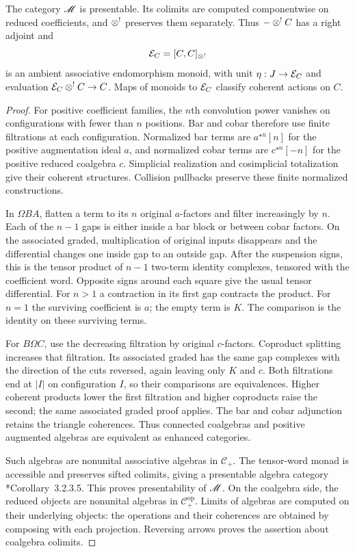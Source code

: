 \begin{lemma}\label{lem:vol2-ambient-endomorphisms}
The category $\mathscr M$ is presentable. Its colimits are computed
componentwise on reduced coefficients, and $\mathbin{\otimes^!}$ preserves
them separately. Thus $-\mathbin{\otimes^!} C$ has a right adjoint and
\[
 \mathcal E_C=[C,C]_{\mathbin{\otimes^!}}
\]
is an ambient associative endomorphism monoid, with unit
$\eta:J\to\mathcal E_C$ and evaluation $\mathcal E_C\mathbin{\otimes^!} C\to C$.
Maps of monoids to $\mathcal E_C$ classify coherent actions on $C$.
\end{lemma}
\begin{proof}
For positive coefficient families, the $n$th convolution power
vanishes on configurations with fewer than $n$ positions.
Bar and cobar therefore use finite filtrations at each
configuration. Normalized bar terms are $a^{\star n}[n]$
for the positive augmentation ideal $a$, and normalized cobar
terms are $c^{\star n}[-n]$ for the positive reduced coalgebra
$c$. Simplicial realization and cosimplicial totalization
give their coherent structures. Collision pullbacks preserve
these finite normalized constructions.

In $\Omega BA$, flatten a term to its $n$ original
$a$-factors and filter increasingly by $n$. Each of the
$n-1$ gaps is either inside a bar block or between cobar
factors. On the associated graded, multiplication of
original inputs disappears and the differential changes
one inside gap to an outside gap. After the suspension
signs, this is the tensor product of $n-1$ two-term identity
complexes, tensored with the coefficient word. Opposite
signs around each square give the usual tensor differential.
For $n>1$ a contraction in its first gap contracts the
product. For $n=1$ the surviving coefficient is $a$;
the empty term is $K$. The comparison is the identity
on these surviving terms.

For $B\Omega C$, use the decreasing filtration by original
$c$-factors. Coproduct splitting increases that filtration.
Its associated graded has the same gap complexes with
the direction of the cuts reversed, again leaving only
$K$ and $c$. Both filtrations end at $|I|$ on configuration
$I$, so their comparisons are equivalences. Higher coherent
products lower the first filtration and higher coproducts
raise the second; the same associated graded proof applies.
The bar and cobar adjunction retains the triangle coherences.
Thus connected coalgebras and positive augmented algebras
are equivalent as enhanced categories.

Such algebras are nonunital associative algebras in
$\mathscr C_+$. The tensor-word monad is accessible and
preserves sifted colimits, giving a presentable algebra
category \cite{LurieHA}*{Corollary~3.2.3.5}. This proves
presentability of $\mathscr M$.
On the coalgebra side, the reduced objects are nonunital
algebras in $\mathscr C_+^{\mathrm{op}}$. Limits of algebras
are computed on their underlying objects: the operations
and their coherences are obtained by composing with each
projection. Reversing arrows proves the assertion about
coalgebra colimits.


\end{proof}
